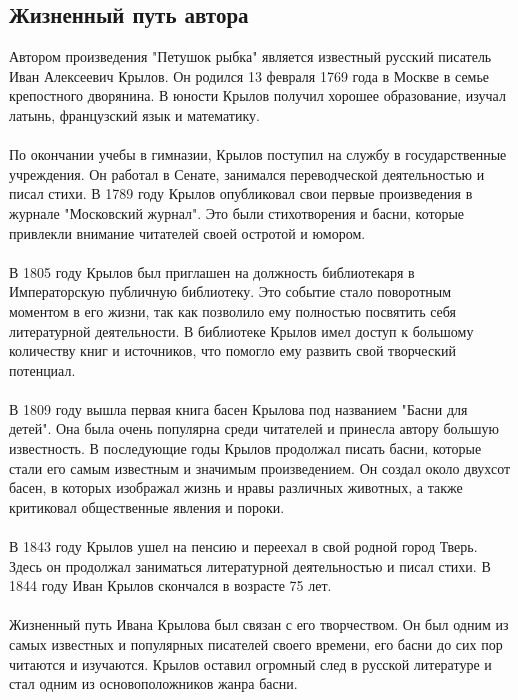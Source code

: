 \documentclass{article}
\begin{document}
\subsection{Жизненный путь автора}
Автором произведения "{}{}Петушок рыбка"{}{} является известный русский писатель Иван Алексеевич Крылов. Он родился 13 февраля 1769 года в Москве в семье крепостного дворянина. В юности Крылов получил хорошее образование, изучал латынь, французский язык и математику.\\
~\\
По окончании учебы в гимназии, Крылов поступил на службу в государственные учреждения. Он работал в Сенате, занимался переводческой деятельностью и писал стихи. В 1789 году Крылов опубликовал свои первые произведения в журнале "{}{}Московский журнал"{}{}. Это были стихотворения и басни, которые привлекли внимание читателей своей остротой и юмором.\\
~\\
В 1805 году Крылов был приглашен на должность библиотекаря в Императорскую публичную библиотеку. Это событие стало поворотным моментом в его жизни, так как позволило ему полностью посвятить себя литературной деятельности. В библиотеке Крылов имел доступ к большому количеству книг и источников, что помогло ему развить свой творческий потенциал.\\
~\\
В 1809 году вышла первая книга басен Крылова под названием "{}{}Басни для детей"{}{}. Она была очень популярна среди читателей и принесла автору большую известность. В последующие годы Крылов продолжал писать басни, которые стали его самым известным и значимым произведением. Он создал около двухсот басен, в которых изображал жизнь и нравы различных животных, а также критиковал общественные явления и пороки.\\
~\\
В 1843 году Крылов ушел на пенсию и переехал в свой родной город Тверь. Здесь он продолжал заниматься литературной деятельностью и писал стихи. В 1844 году Иван Крылов скончался в возрасте 75 лет.\\
~\\
Жизненный путь Ивана Крылова был связан с его творчеством. Он был одним из самых известных и популярных писателей своего времени, его басни до сих пор читаются и изучаются. Крылов оставил огромный след в русской литературе и стал одним из основоположников жанра басни.
\end{document}
